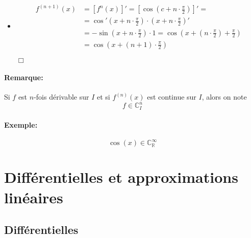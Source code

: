 \documentclass[
    11pt,
    a4paper,
    oneside,
    headinlcude, footinclude,
    twoside,
]{report}
\newcommand{\cqfd}[0]{\begin{flushright}$\Box$\end{flushright}}
\begin{document}
\begin{enumerate}
\begin{itemize}
\begin{itemize}
                    \item 
                        \[
                            \begin{split}
                                f^{(n+1)}(x) &= [f^{n}(x)]' = \left[ \cos\left(c +
                                    n \cdot \frac{\pi}{2}\right) \right]'  =\\
                                &= \cos'\left(x + n \cdot
                                    \frac{\pi}{2}\right) \cdot \left(x + n
                                    \cdot \frac{\pi}{2}\right)'\\
                                &= - \sin\left(x + n \cdot \frac{\pi}{2}\right)
                                    \cdot 1 = \cos\left(x + \left(n \cdot \frac{\pi}{2}\right)+
                                    \frac{\pi}{2}\right) \\
                                &= \cos\left(x + (n+1) \cdot \frac{\pi}{2}\right)
                            \end{split}
                        \]
                        \cqfd
                \end{itemize}
        \end{itemize}
\end{enumerate}

\paragraph{Remarque:}

Si $f$ est $n$-fois dérivable sur $I$ et si $f^{(n)}(x)$ est continue sur $I$,
alors on note
$$ f \in \mathbb{C}^{n}_{I}$$

\paragraph{Exemple:}

$$\cos(x) \in \mathbb{C}^{\infty}_{\mathbb{R}}$$


\section{Différentielles et approximations linéaires}
\label{sec:differentielles_et_approximations_lineaires}

\subsection{Différentielles}
\label{sub:differentielles}
\end{document}
